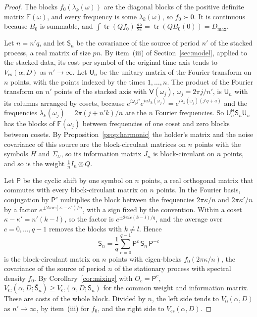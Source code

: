 \documentclass[11pt,onecolumn]{IEEEtran}
\newcommand{\tr}{\operatorname{tr}}
\newcommand{\dl}{\tfrac{d\lambda}{2\pi}}
\newcommand{\herm}{\mathsf H}
\newcommand{\VG}{V_{\mathrm G}}
\newcommand{\cF}{\mathbb F}
\begin{document}
\begin{proof}
The blocks $f_0(\lambda_k(\omega))$ are the diagonal blocks of the
positive definite matrix $\cF(\omega)$, and every frequency is some
$\lambda_k(\omega)$, so $f_0\succ0$. It is continuous because $B_0$ is
summable, and $\int\tr(Qf_0)\,\dl=\tr(QB_0(0))=D_{\max}$.

Let $n=n'q$, and let $\mathsf S_n$ be the covariance of the source of
period $n'$ of the stacked process, a real matrix of size $pn$. By
item~(iii) of Section~\ref{sec:model}, applied to the stacked data, its
cost per symbol of the original time axis tends to
$V_{\mathrm{cs}}(\alpha,D)$ as $n'\to\infty$. Let $\mathsf U_n$ be the
unitary matrix of the Fourier transform on $n$ points, with the points
indexed by the times $1,\dots,n$. The product of the Fourier transform
on $n'$ points of the stacked axis with $\mathsf V(\omega_j)$,
$\omega_j=2\pi j/n'$, is $\mathsf U_n$ with its columns arranged by
cosets, because
$e^{i\omega_jj'}e^{ia\lambda_k(\omega_j)}=e^{i\lambda_k(\omega_j)(j'q+a)}$
and the frequencies $\lambda_k(\omega_j)=2\pi(j+n'k)/n$ are the $n$
Fourier frequencies. So $\mathsf U_n^{\herm}\mathsf S_n\mathsf U_n$ has
the blocks of $\cF(\omega_j)$ between frequencies of one coset and
zero blocks between cosets. By Proposition~\ref{prop:harmonic} the
holder's matrix and the noise covariance of this source are the
block-circulant matrices on $n$ points with the symbols $H$ and
$\Sigma_U$, so its information matrix $J_n$ is block-circulant on $n$
points, and so is the weight $\tfrac1nI_n\otimes Q$.

Let $\mathsf P$ be the cyclic shift by one symbol on $n$ points, a real
orthogonal matrix that commutes with every block-circulant matrix on
$n$ points. In the Fourier basis, conjugation by $\mathsf P^c$
multiplies the block between the frequencies $2\pi\kappa/n$ and
$2\pi\kappa'/n$ by a factor $e^{\pm2\pi ic(\kappa-\kappa')/n}$, with a
sign fixed by the convention. Within a coset
$\kappa-\kappa'=n'(k-l)$, so the factor is $e^{\pm2\pi ic(k-l)/q}$, and
the average over $c=0,\dots,q-1$ removes the blocks with $k\ne l$. Hence
\[
\bar{\mathsf S}_n=\frac1q\sum_{c=0}^{q-1}\mathsf P^c\,\mathsf S_n\,\mathsf P^{-c}
\]
is the block-circulant matrix on $n$ points with eigen-blocks
$f_0(2\pi\kappa/n)$, the covariance of the source of period $n$ of the
stationary process with spectral density $f_0$. By
Corollary~\ref{cor:mixing} with $O_c=\mathsf P^c$,
$\VG(\alpha,D;\bar{\mathsf S}_n)\ge\VG(\alpha,D;\mathsf S_n)$ for the
common weight and information matrix. These are costs of the whole
block. Divided by $n$, the left side tends to $V_0(\alpha,D)$ as
$n'\to\infty$, by item~(iii) for $f_0$, and the right side to
$V_{\mathrm{cs}}(\alpha,D)$.
\end{proof}
\end{document}
